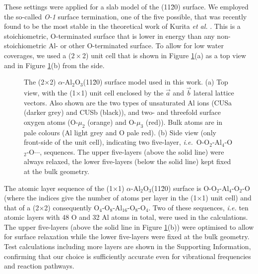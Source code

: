\documentclass[twoside,twocolumn,9pt]{article}
\begin{document}
These settings were applied for a slab model of the (11\=20) surface. We employed the so-called \textit{O-1} surface termination, one of the five possible, that was recently found to be the most stable in the theoretical work of Kurita {\it et al.} \cite{kuri10}. This is a stoichiometric, O-terminated surface that is lower in energy than any non-stoichiometric Al- or other O-terminated surface. To allow for low water coverages, we used a ($2\times$2) unit cell that is shown in Figure \ref{abb:unitcell}(a) as a top view and in Figure \ref{abb:unitcell}(b) from the side. 
%
\begin{figure} [!h]
\centering
{}%
         \qquad
\caption{The (2$\times$2) $\alpha$-Al$_2$O$_3$(11\=20) surface model used in this work. (a) Top view, with the (1$\times$1) unit cell enclosed by the $\vec{a}$ and $\vec{b}$ lateral lattice vectors. Also shown are the two types of unsaturated  Al ions (CUSa (darker grey) and CUSb (black)), and two-  and threefold surface oxygen atoms (O-$\mu_2$ (orange) and O-$\mu_3$ (red)). Bulk atoms are in pale colours (Al light grey and O pale red). (b) Side view (only front-side of the unit cell), indicating two five-layer, \textit{i.e.}\ O-O$_2$-Al$_4$-O$_2$-O$\cdots$, sequences. The upper five-layers (above the solid line) were always relaxed, the lower five-layers (below the solid line) kept fixed at the bulk geometry.}
       \label{abb:unitcell}
\end{figure}
%
The atomic layer sequence of the (1$\times$1) $\alpha$-Al$_{2}$O$_{3}$(11\=20) surface is O-O$_2$-Al$_4$-O$_2$-O (where the indices give the number of atoms per layer in the (1$\times$1) unit cell) and that of a (2$\times$2) consequently O$_4$-O$_8$-Al$_{16}$-O$_8$-O$_4$. Two of these sequences, \textit{i.e.} ten atomic layers with 48 O and 32 Al atoms in total, were used in the calculations.
The upper five-layers (above the solid line in Figure \ref{abb:unitcell}(b)) were optimised to allow for surface relaxation while the lower five-layers were fixed at the bulk geometry. Test calculations including more layers are shown in the Supporting Information, confirming that our choice is sufficiently accurate even for vibrational frequencies and 
 reaction pathways. 
\end{document}
